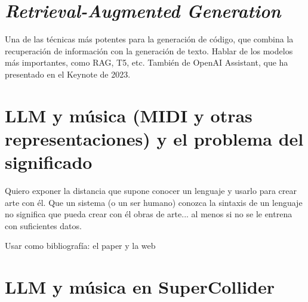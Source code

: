\section{\textit{Retrieval-Augmented Generation}}
    Una de las técnicas más potentes para la generación de código, que combina la recuperación de información con la generación de texto. Hablar de los modelos más importantes, como RAG, T5, etc. También de OpenAI Assistant, que ha presentado en el Keynote de 2023.

\section{LLM y música (MIDI y otras representaciones) y el problema del significado}
    Quiero exponer la distancia que supone conocer un lenguaje y usarlo para crear arte con él. Que un sistema (o un ser humano) conozca la sintaxis de un lenguaje no significa que pueda crear con él obras de arte... al menos si no se le entrena con suficientes datos.
    
    Usar como bibliografía: el paper \cite{lewisRetrievalAugmentedGenerationKnowledgeIntensive2021} y la web \cite{WhatRetrievalaugmentedGeneration2021}

\section{LLM y música en SuperCollider}